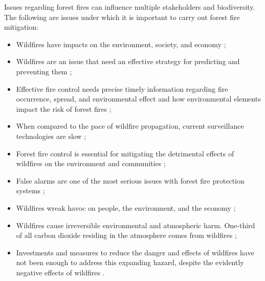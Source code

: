 Issues regarding forest fires can influence multiple stakeholders and biodiversity. The following are issues under which it is important to carry out forest fire mitigation:
\begin{itemize}
    \item Wildfires have impacts on the environment, society, and economy \cite{UNDESA2023};
    \item Wildfires are an issue that need an effective strategy for predicting and preventing them \cite{9726029};
    \item Effective fire control needs precise timely information regarding fire occurrence, spread, and environmental effect and how environmental elements impact the risk of forest fires \cite{arif2021role, 10085661};
    \item When compared to the pace of wildfire propagation, current surveillance technologies are slow \cite{9726029};
    \item Forest fire control is essential for mitigating the detrimental effects of wildfires on the environment and communities \cite{10085661};
    \item False alarms are one of the most serious issues with forest fire protection systems \cite{9726029};
    \item Wildfires wreak havoc on people, the environment, and the economy \cite{10085661} \cite{Sharma2020};
    \item Wildfires cause irreversible environmental and atmospheric harm. One-third of all carbon dioxide residing in the atmosphere comes from wildfires \cite{doi:10.1155/2014/597368};
    \item Investments and measures to reduce the danger and effects of wildfires have not been enough to address this expanding hazard, despite the evidently negative effects of wildfires \cite{UNDESA2023}.
\end{itemize}


